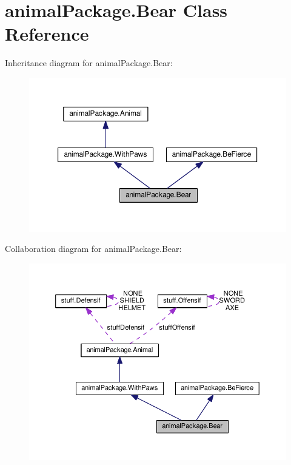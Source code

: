 \hypertarget{classanimal_package_1_1_bear}{}\section{animal\+Package.\+Bear Class Reference}
\label{classanimal_package_1_1_bear}


Inheritance diagram for animal\+Package.\+Bear\+:\nopagebreak
\begin{figure}[H]
\begin{center}
\leavevmode
\includegraphics[width=350pt]{classanimal_package_1_1_bear__inherit__graph}
\end{center}
\end{figure}


Collaboration diagram for animal\+Package.\+Bear\+:\nopagebreak
\begin{figure}[H]
\begin{center}
\leavevmode
\includegraphics[width=350pt]{classanimal_package_1_1_bear__coll__graph}
\end{center}
\end{figure}
